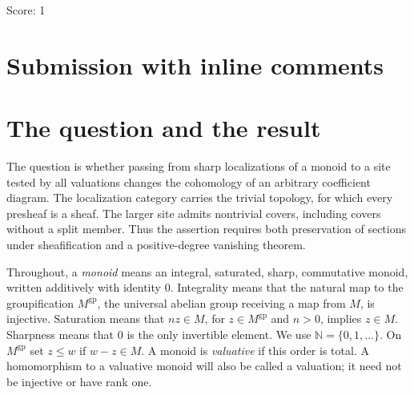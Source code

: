 \documentclass[11pt]{article}
\theoremstyle{definition}
\theoremstyle{remark}
\newcommand{\N}{\mathbb N}
\newcommand{\gp}{\mathrm{gp}}
\begin{document}
\noindent Score: 1

\newpage
\section{Submission with inline comments}


\begin{abstract}
Let $P$ be an integral, saturated, sharp commutative monoid. We compare the birhizomic site of monoids under $P$ with the category of sharp localizations $P[-x]^\sharp$, equipped with the trivial topology. For every abelian presheaf $F$ on the latter category, we prove that the canonical morphism $F\to R\pi_*\pi^{-1}F$ is a quasi-isomorphism. In fact, the left Kan extension defining $\pi^{-1}F$ is already a sheaf and has vanishing positive-degree cohomology on every object. The proof refines arbitrary covers by finitely many inequality charts, reduces their relevant intersections to finitely generated monoids, and identifies the coefficient complexes with relative simplicial cochains. A separate descent argument passes from these finite complexes to derived cohomology. No finiteness or rank assumption on $P$, and no restriction on the abelian coefficient diagram, is required.
\end{abstract}

\section{The question and the result}

The question is whether passing from sharp localizations of a monoid to a site tested by all valuations changes the cohomology of an arbitrary coefficient diagram. The localization category carries the trivial topology, for which every presheaf is a sheaf. The larger site admits nontrivial covers, including covers without a split member. Thus the assertion requires both preservation of sections under sheafification and a positive-degree vanishing theorem.

Throughout, a \emph{monoid} means an integral, saturated, sharp, commutative monoid, written additively with identity $0$. Integrality means that the natural map to the groupification $M^{\gp}$, the universal abelian group receiving a map from $M$, is injective. Saturation means that $nz\in M$, for $z\in M^{\gp}$ and $n>0$, implies $z\in M$. Sharpness means that $0$ is the only invertible element. We use $\N=\{0,1,\ldots\}$. On $M^{\gp}$ set $z\leq w$ if $w-z\in M$. A monoid is \emph{valuative} if this order is total. A homomorphism to a valuative monoid will also be called a valuation; it need not be injective or have rank one.
\end{document}
